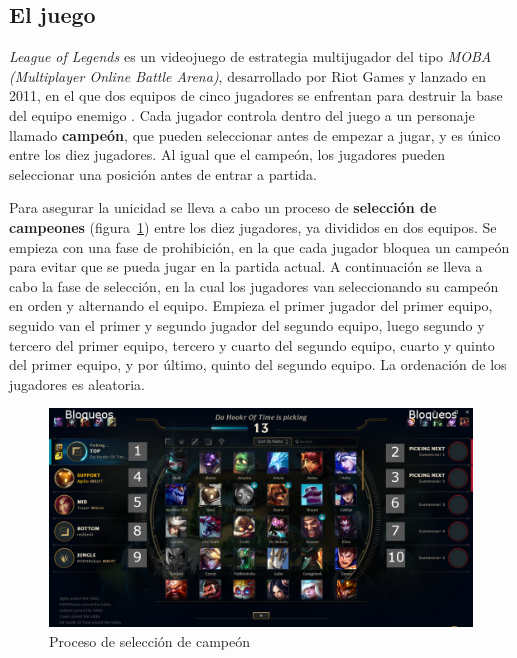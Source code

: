\subsection{El juego}
\textit{League of Legends} es un videojuego de estrategia multijugador del tipo \textit{MOBA (Multiplayer Online Battle Arena)}, desarrollado por Riot Games y lanzado en 2011, en el que dos equipos de cinco jugadores se enfrentan para destruir la base del equipo enemigo \cite{misc:como-jugar}. Cada jugador controla dentro del juego a un personaje llamado \textbf{campeón}, que pueden seleccionar antes de empezar a jugar, y es único entre los diez jugadores. Al igual que el campeón, los jugadores pueden seleccionar una posición antes de entrar a partida.

Para asegurar la unicidad se lleva a cabo un proceso de \textbf{selección de campeones} (figura~\ref{fig:early-pick}) entre los diez jugadores, ya divididos en dos equipos. Se empieza con una fase de prohibición, en la que cada jugador bloquea un campeón para evitar que se pueda jugar en la partida actual. A continuación se lleva a cabo la fase de selección, en la cual los jugadores van seleccionando su campeón en orden y alternando el equipo. Empieza el primer jugador del primer equipo, seguido van el primer y segundo jugador del segundo equipo, luego segundo y tercero del primer equipo, tercero y cuarto del segundo equipo, cuarto y quinto del primer equipo, y por último, quinto del segundo equipo. La ordenación de los jugadores es aleatoria.

\begin{figure}[h]
	\centering
	\includegraphics[width=1\linewidth]{img/early-pick}
	\caption{Proceso de selección de campeón}
	\label{fig:early-pick}
\end{figure}

